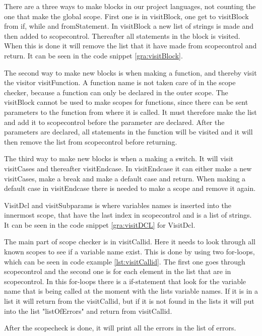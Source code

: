 There are a three ways to make blocks in our project languages, not counting the one that make the global scope. First one is in visitBlock, one get to visitBlock from if, while and fromStatement. In visitBlock a new list of strings is made and then added to scopecontrol. Thereafter all statements in the block is visited. When this is done it will remove the list that it have made from scopecontrol and return. It can be seen in the code snippet \ref{gra:visitBlock}.


The second way to make new blocks is when making a function, and thereby visit the visitor visitFunction. A function name is not taken care of in the scope checker, because a function can only be declared in the outer scope. The visitBlock cannot be used to make scopes for functions, since there can be sent parameters to the function from where it is called. It must therefore make the list and add it to scopecontrol before the parameter are declared. After the parameters are declared, all statements in the function will be visited and it will then remove the list from scopecontrol before returning.

The third way to make new blocks is when a making a switch. It will visit visitCases and thereafter visitEndcase. In visitEndcase it can either make a new visitCases, make a break and make a default case and return. When making a default case in visitEndcase there is needed to make a scope and remove it again.


VisitDcl and visitSubparams is where variables names is inserted into the innermost scope, that have the last index in scopecontrol and is a list of strings. It can be seen in the code snippet \ref{gra:visitDCL} for VisitDcl.


The main part of scope checker is in visitCallid. Here it needs to look through all known scopes to see if a variable name exist. This is done by using two for-loops, which can be seen in code example \ref{lst:visitCallid}. The first one goes through scopecontrol and the second one is for each element in the list that are in scopecontrol. In this for-loops there is a if-statement that look for the variable name that is being called at the moment with the lists variable names. If it is in a list it will return from the visitCallid, but if it is not found in the lists it will put into the list "listOfErrors" and return from visitCallid.


After the scopecheck is done, it will print all the errors in the list of errors.
